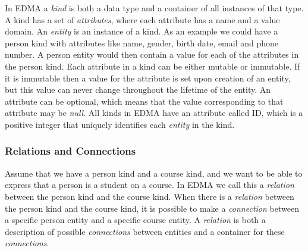 In EDMA a \emph{kind} is
both a data type and a container of all instances of that type. A
kind has a set of \emph{attributes},
where each attribute has a name and a value domain. An \emph{entity}
is an instance of a kind. As an example we could have a person kind
with attributes like name, gender, birth date, email and phone number.
A person entity would then contain a value for each of the attributes
in the person kind. Each attribute in a kind can be either mutable
or immutable. If it is immutable then a value for the attribute is
set upon creation of an entity, but this value can never change throughout
the lifetime of the entity. An attribute can be optional, which means
that the value corresponding to that attribute may be \emph{null}.
All kinds in EDMA have an attribute called ID, which is a positive
integer that uniquely identifies each \emph{entity} in the kind.


\subsubsection{Relations and Connections}

Assume that we have a person kind and a course kind, and we want to
be able to express that a person is a student on a course. In EDMA
we call this a \emph{relation}
between the person kind and the course kind. When there is a \emph{relation}
between the person kind and the course kind, it is possible to make
a \emph{connection} between a specific person entity and a specific
course entity. A \emph{relation} is both a description of possible
\emph{connections} between entities and a container for these \emph{connections}.

